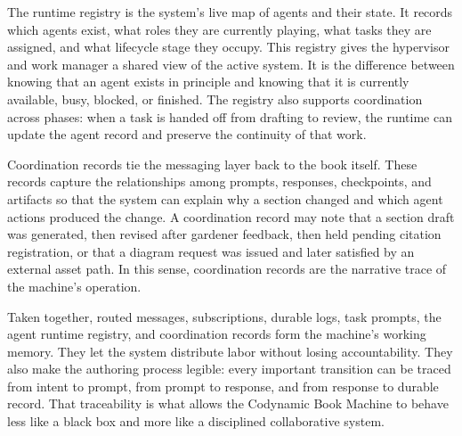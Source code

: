 The runtime registry is the system's live map of agents and their state. It records which agents exist, what roles they are currently playing, what tasks they are assigned, and what lifecycle stage they occupy. This registry gives the hypervisor and work manager a shared view of the active system. It is the difference between knowing that an agent exists in principle and knowing that it is currently available, busy, blocked, or finished. The registry also supports coordination across phases: when a task is handed off from drafting to review, the runtime can update the agent record and preserve the continuity of that work.

Coordination records tie the messaging layer back to the book itself. These records capture the relationships among prompts, responses, checkpoints, and artifacts so that the system can explain why a section changed and which agent actions produced the change. A coordination record may note that a section draft was generated, then revised after gardener feedback, then held pending citation registration, or that a diagram request was issued and later satisfied by an external asset path. In this sense, coordination records are the narrative trace of the machine's operation.

Taken together, routed messages, subscriptions, durable logs, task prompts, the agent runtime registry, and coordination records form the machine's working memory. They let the system distribute labor without losing accountability. They also make the authoring process legible: every important transition can be traced from intent to prompt, from prompt to response, and from response to durable record. That traceability is what allows the Codynamic Book Machine to behave less like a black box and more like a disciplined collaborative system.
